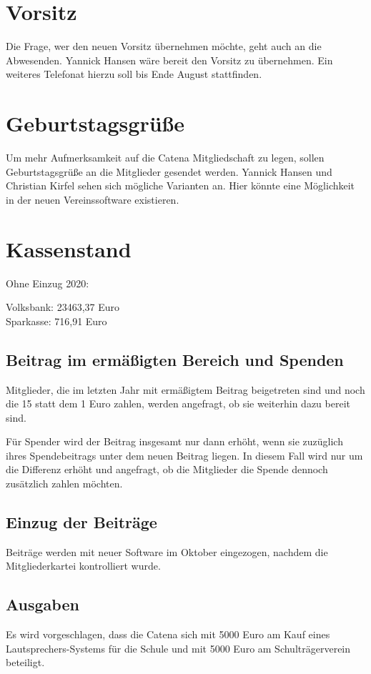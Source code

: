 \documentclass[a4paper, 11pt]{article}
\begin{document}
\section*{Vorsitz}

Die Frage, wer den neuen Vorsitz übernehmen möchte, geht auch an die Abwesenden.
Yannick Hansen wäre bereit den Vorsitz zu übernehmen.
Ein weiteres Telefonat hierzu soll bis Ende August stattfinden.

\section*{Geburtstagsgrüße}

Um mehr Aufmerksamkeit auf die Catena Mitgliedschaft zu legen, sollen Geburtstagsgrüße an die Mitglieder gesendet werden.
Yannick Hansen und Christian Kirfel sehen sich mögliche Varianten an.
Hier könnte eine Möglichkeit in der neuen Vereinssoftware existieren.

\section*{Kassenstand}

Ohne Einzug 2020:

Volksbank: 23463,37 Euro\\
Sparkasse: 716,91 Euro


\subsection*{Beitrag im ermäßigten Bereich und Spenden}

Mitglieder, die im letzten Jahr mit ermäßigtem Beitrag beigetreten sind und noch die 15 statt dem 1 Euro zahlen,
werden angefragt, ob sie weiterhin dazu bereit sind.

Für Spender wird der Beitrag insgesamt nur dann erhöht, wenn sie zuzüglich ihres Spendebeitrags unter dem neuen Beitrag liegen.
In diesem Fall wird nur um die Differenz erhöht und angefragt, ob die Mitglieder die Spende dennoch zusätzlich zahlen möchten.

\subsection*{Einzug der Beiträge}

Beiträge werden mit neuer Software im Oktober eingezogen, nachdem die Mitgliederkartei kontrolliert wurde.

\subsection*{Ausgaben}

Es wird vorgeschlagen, dass die Catena sich mit 5000 Euro am Kauf eines Lautsprechers-Systems für die Schule und mit 5000 Euro am Schulträgerverein beteiligt.
\end{document}
